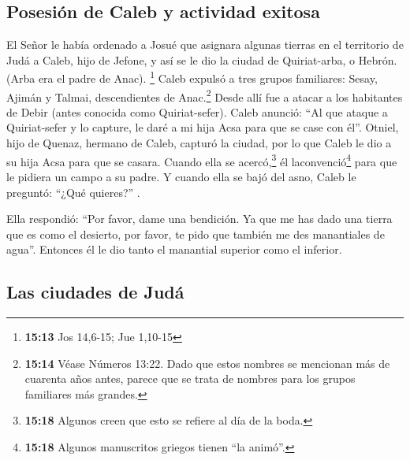 \hypertarget{posesiuxf3n-de-caleb-y-actividad-exitosa}{%
\subsection{Posesión de Caleb y actividad
exitosa}\label{posesiuxf3n-de-caleb-y-actividad-exitosa}}

 El Señor le había ordenado a Josué que asignara algunas
tierras en el territorio de Judá a Caleb, hijo de Jefone, y así se le
dio la ciudad de Quiriat-arba, o Hebrón. (Arba era el padre de Anac).
\footnote{\textbf{15:13} Jos 14,6-15; Jue 1,10-15}  Caleb
expulsó a tres grupos familiares: Sesay, Ajimán y Talmai, descendientes
de Anac.\footnote{\textbf{15:14} Véase Números 13:22. Dado que estos
  nombres se mencionan más de cuarenta años antes, parece que se trata
  de nombres para los grupos familiares más grandes.} 
Desde allí fue a atacar a los habitantes de Debir (antes conocida como
Quiriat-sefer).  Caleb anunció: ``Al que ataque a
Quiriat-sefer y lo capture, le daré a mi hija Acsa para que se case con
él''.  Otniel, hijo de Quenaz, hermano de Caleb, capturó
la ciudad, por lo que Caleb le dio a su hija Acsa para que se casara.
 Cuando ella se acercó,\footnote{\textbf{15:18} Algunos
  creen que esto se refiere al día de la boda.} él
laconvenció\footnote{\textbf{15:18} Algunos manuscritos griegos tienen
  ``la animó''.} para que le pidiera un campo a su padre. Y cuando ella
se bajó del asno, Caleb le preguntó: ``¿Qué quieres?'' .

 Ella respondió: ``Por favor, dame una bendición. Ya que
me has dado una tierra que es como el desierto, por favor, te pido que
también me des manantiales de agua''. Entonces él le dio tanto el
manantial superior como el inferior.

\hypertarget{las-ciudades-de-juduxe1}{%
\subsection{Las ciudades de Judá}\label{las-ciudades-de-juduxe1}}

